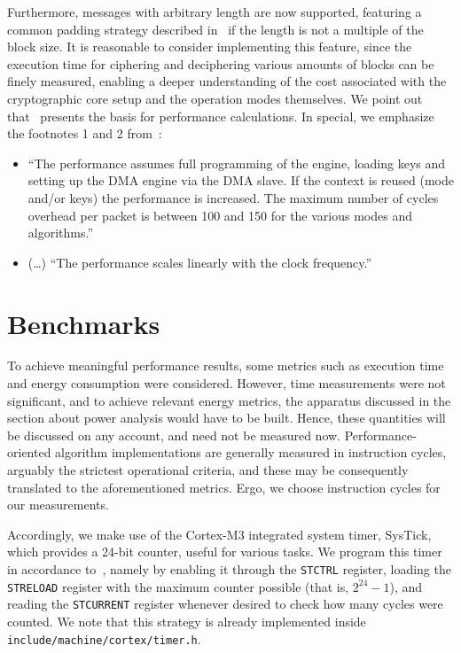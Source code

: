 \documentclass{../sftex/sftex}
\begin{document}
Furthermore, messages with arbitrary length are now supported, featuring a
common padding strategy described in~\cite{Kaliski:report:1998:mar} if the
length is not a multiple of the block size. It is reasonable to consider
implementing this feature, since the execution time for ciphering and
deciphering various amounts of blocks can be finely measured, enabling a deeper
understanding of the cost associated with the cryptographic core setup and the
operation modes themselves. We point out that~\cite[Sec.
22.2.4]{Texas:report:2013:may} presents the basis for performance calculations.
In special, we emphasize the footnotes 1 and 2 from~\cite[Table
22--88]{Texas:report:2013:may}:

\begin{itemize}

  \item ``The performance assumes full programming of the engine, loading keys
      and setting up the DMA engine via the DMA slave. If the context is reused
        (mode and/or keys) the performance is increased. The maximum number of
        cycles overhead per packet is between 100 and 150 for the various modes
        and algorithms.''

   \item (\ldots) ``The performance scales linearly with the clock frequency.''

\end{itemize}

\section{Benchmarks}

To achieve meaningful performance results, some metrics such as execution time
and energy consumption were considered. However, time measurements were not
significant, and to achieve relevant energy metrics, the apparatus discussed in
the section about power analysis would have to be built. Hence, these
quantities will be discussed on any account, and need not be measured now.
Performance-oriented algorithm implementations are generally measured in
instruction cycles, arguably the strictest operational criteria, and these may
be consequently translated to the aforementioned metrics. Ergo, we choose
instruction cycles for our measurements.

Accordingly, we make use of the Cortex-M3 integrated system timer, SysTick,
which provides a 24-bit counter, useful for various tasks. We program this
timer in accordance to~\cite[Sec. 3.4]{Texas:report:2013:may}, namely by
enabling it through the \verb!STCTRL! register, loading the \verb!STRELOAD!
register with the maximum counter possible (that is, $2^{24} - 1$), and reading
the \verb!STCURRENT! register whenever desired to check how many cycles were
counted. We note that this strategy is already implemented inside
\verb!include/machine/cortex/timer.h!.
\end{document}
